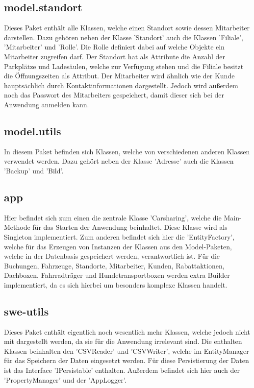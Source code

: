 \subsection{model.standort}

Dieses Paket enthält alle Klassen, welche einen Standort sowie dessen Mitarbeiter darstellen. Dazu gehören neben der Klasse 'Standort' auch die Klassen 'Filiale', 'Mitarbeiter' und 'Rolle'. Die Rolle definiert dabei auf welche Objekte ein Mitarbeiter zugreifen darf. Der Standort hat als Attribute die Anzahl der Parkplätze und Ladesäulen, welche zur Verfügung stehen und die Filiale besitzt die Öffnungszeiten als Attribut. Der Mitarbeiter wird ähnlich wie der Kunde hauptsächlich durch Kontaktinformationen dargestellt. Jedoch wird außerdem noch das Passwort des Mitarbeiters gespeichert, damit dieser sich bei der Anwendung anmelden kann.

\subsection{model.utils}

In diesem Paket befinden sich Klassen, welche von verschiedenen anderen Klassen verwendet werden. Dazu gehört neben der Klasse 'Adresse' auch die Klassen 'Backup' und 'Bild'.

\subsection{app}

Hier befindet sich zum einen die zentrale Klasse 'Carsharing', welche die Main-Methode für das Starten der Anwendung beinhaltet. Diese Klasse wird als Singleton implementiert. Zum anderen befindet sich hier die 'EntityFactory', welche für das Erzeugen von Instanzen der Klassen aus den Model-Paketen, welche in der Datenbasis gespeichert werden, verantwortlich ist. Für die Buchungen, Fahrzeuge, Standorte, Mitarbeiter, Kunden, Rabattaktionen, Dachboxen, Fahrradträger und Hundetransportboxen werden extra Builder implementiert, da es sich hierbei um besonders komplexe Klassen handelt. 

\subsection{swe-utils}

Dieses Paket enthält eigentlich noch wesentlich mehr Klassen, welche jedoch nicht mit dargestellt werden, da sie für die Anwendung irrelevant sind. Die enthalten Klassen beinhalten den 'CSVReader' und 'CSVWriter', welche im EntityManager für das Speichern der Daten eingesetzt werden. Für diese Persistierung der Daten ist das Interface 'IPersistable' enthalten. Außerdem befindet sich hier auch der 'PropertyManager' und der 'AppLogger'.

